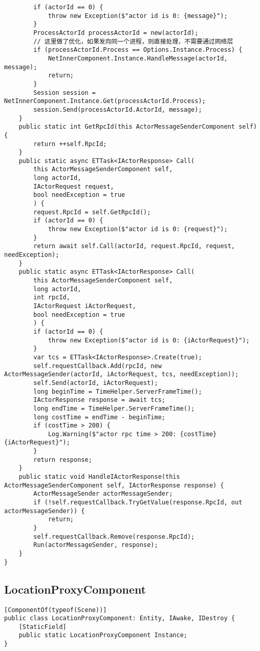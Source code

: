\documentclass[9pt, b5paper]{article}
\begin{document}
\begin{verbatim}
        if (actorId == 0) {
            throw new Exception($"actor id is 0: {message}");
        }
        ProcessActorId processActorId = new(actorId);
        // 这里做了优化，如果发向同一个进程，则直接处理，不需要通过网络层
        if (processActorId.Process == Options.Instance.Process) {
            NetInnerComponent.Instance.HandleMessage(actorId, message);
            return;
        }
        Session session = NetInnerComponent.Instance.Get(processActorId.Process);
        session.Send(processActorId.ActorId, message);
    }
    public static int GetRpcId(this ActorMessageSenderComponent self) {
        return ++self.RpcId;
    }
    public static async ETTask<IActorResponse> Call(
        this ActorMessageSenderComponent self,
        long actorId,
        IActorRequest request,
        bool needException = true
        ) {
        request.RpcId = self.GetRpcId();
        if (actorId == 0) {
            throw new Exception($"actor id is 0: {request}");
        }
        return await self.Call(actorId, request.RpcId, request, needException);
    }
    public static async ETTask<IActorResponse> Call(
        this ActorMessageSenderComponent self,
        long actorId,
        int rpcId,
        IActorRequest iActorRequest,
        bool needException = true
        ) {
        if (actorId == 0) {
            throw new Exception($"actor id is 0: {iActorRequest}");
        }
        var tcs = ETTask<IActorResponse>.Create(true);
        self.requestCallback.Add(rpcId, new ActorMessageSender(actorId, iActorRequest, tcs, needException));
        self.Send(actorId, iActorRequest);
        long beginTime = TimeHelper.ServerFrameTime();
        IActorResponse response = await tcs;
        long endTime = TimeHelper.ServerFrameTime();
        long costTime = endTime - beginTime;
        if (costTime > 200) {
            Log.Warning($"actor rpc time > 200: {costTime} {iActorRequest}");
        }
        return response;
    }
    public static void HandleIActorResponse(this ActorMessageSenderComponent self, IActorResponse response) {
        ActorMessageSender actorMessageSender;
        if (!self.requestCallback.TryGetValue(response.RpcId, out actorMessageSender)) {
            return;
        }
        self.requestCallback.Remove(response.RpcId);
        Run(actorMessageSender, response);
    }
}
\end{verbatim}
\subsection{LocationProxyComponent}
\label{sec-1-4}
\begin{verbatim}
[ComponentOf(typeof(Scene))]
public class LocationProxyComponent: Entity, IAwake, IDestroy {
    [StaticField]
    public static LocationProxyComponent Instance;
}
\end{verbatim}
\end{document}
